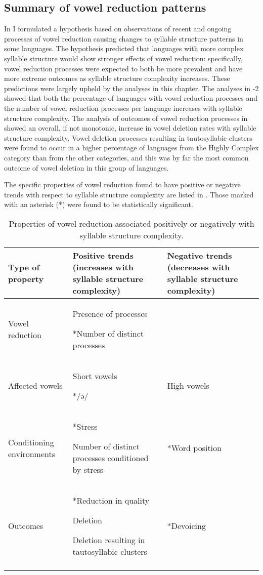 \subsection{Summary of vowel reduction patterns}\label{sec:6.3.7}

  In  I formulated a hypothesis based on observations of recent and ongoing processes of vowel reduction causing changes to syllable structure patterns in some languages. The hypothesis predicted that languages with more complex syllable structure would show stronger effects of vowel reduction: specifically, vowel reduction processes were expected to both be more prevalent and have more extreme outcomes as syllable structure complexity increases. These predictions were largely upheld by the analyses in this chapter. The analyses in -2 showed that both the percentage of languages with vowel reduction processes and the number of vowel reduction processes per language increases with syllable structure complexity. The analysis of outcomes of vowel reduction processes in  showed an overall, if not monotonic, increase in vowel deletion rates with syllable structure complexity. Vowel deletion processes resulting in tautosyllabic clusters were found to occur in a higher percentage of languages from the Highly Complex category than from the other categories, and this was by far the most common outcome of vowel deletion in this group of languages.

  The specific properties of vowel reduction found to have positive or negative trends with respect to syllable structure complexity are listed in . Those marked with an asterisk (*) were found to be statistically significant.

\begin{table}
\begin{tabularx}{\textwidth}{XXX}
\lsptoprule

{Type of property} & Positive trends (increases with syllable structure complexity) & Negative trends (decreases with syllable structure complexity)\\\midrule
{Vowel reduction} & Presence of processes

*Number of distinct processes & \\
{Affected vowels} & Short vowels

*/ə/ & High vowels\\
{Conditioning environments} & *Stress

Number of distinct processes conditioned by stress & *Word position\\
{Outcomes} & *Reduction in quality

Deletion

Deletion resulting in tautosyllabic clusters & *Devoicing\\
\lspbottomrule
\end{tabularx}
\caption{\label{tab:6.10}Properties of vowel reduction associated positively or negatively with syllable structure complexity.}
\end{table}

